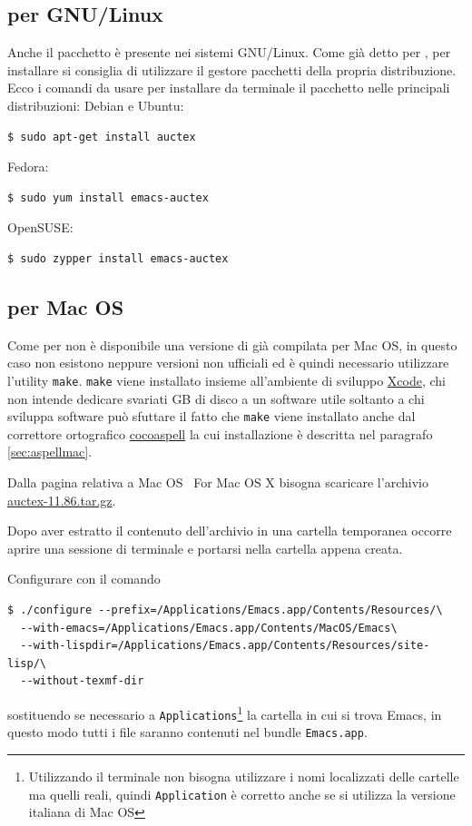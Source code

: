\documentclass[11pt,a4paper]{article}
\begin{document}
\subsection{\auctex{} per GNU/Linux}
\label{sec:auctexlinux}

Anche il pacchetto \auctex{} è presente nei sistemi GNU/Linux. Come già detto
per \emacs, per installare \auctex{} si consiglia di utilizzare il gestore
pacchetti della propria distribuzione. Ecco i comandi da usare per installare da
terminale il pacchetto nelle principali distribuzioni: Debian e Ubuntu:
\begin{Verbatim}
$ sudo apt-get install auctex
\end{Verbatim}
Fedora:
\begin{Verbatim}
$ sudo yum install emacs-auctex
\end{Verbatim}
OpenSUSE:
\begin{Verbatim}
$ sudo zypper install emacs-auctex
\end{Verbatim}


\subsection{\auctex{} per Mac OS}
\label{sec:auctexmac}

Come per \emacs{} non è disponibile una versione di \auctex{} già compilata per
Mac OS, in questo caso non esistono neppure versioni non ufficiali ed è quindi
necessario utilizzare l'utility \texttt{make}.  \texttt{make} viene installato
insieme all'ambiente di sviluppo
\href{http://developer.apple.com/technologies/tools/whats-new.html}%
{Xcode}, chi non intende dedicare svariati GB di disco a un software utile
soltanto a chi sviluppa software può sfuttare il fatto che \texttt{make} viene
installato anche dal correttore ortografico
\href{http://cocoaspell.leuski.net/}{cocoaspell} la cui installazione è
descritta nel paragrafo \ref{sec:aspellmac}.

Dalla pagina relativa a Mac OS
%
{\auctex\ For Mac OS X} bisogna scaricare l'archivio
\href{http://ftp.gnu.org/pub/gnu/auctex/auctex-11.86.tar.gz}%
{auctex-11.86.tar.gz}.

Dopo aver estratto il contenuto dell'archivio in una cartella temporanea occorre
aprire una sessione di terminale e portarsi nella cartella appena creata.

Configurare \auctex{} con il comando
\begin{Verbatim}
$ ./configure --prefix=/Applications/Emacs.app/Contents/Resources/\
  --with-emacs=/Applications/Emacs.app/Contents/MacOS/Emacs\
  --with-lispdir=/Applications/Emacs.app/Contents/Resources/site-lisp/\
  --without-texmf-dir
\end{Verbatim}
sostituendo se necessario a \texttt{Applications}\footnote{Utilizzando il
  terminale non bisogna utilizzare i nomi localizzati delle cartelle ma quelli
  reali, quindi \texttt{Application} è corretto anche se si utilizza la versione
  italiana di Mac OS} la cartella in cui si trova Emacs, in questo modo tutti i
file saranno contenuti nel bundle \texttt{Emacs.app}.
\end{document}
